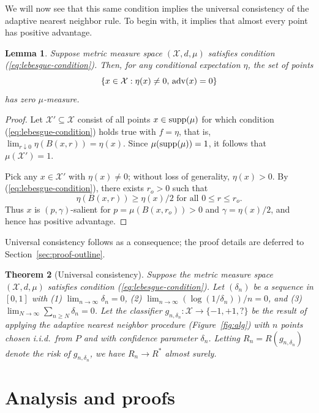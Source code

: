 \documentclass{article}
\def\X{{\mathcal X}}
\def\supp{{\rm supp}}
\def\adv{{\rm adv}}
\newtheorem{theorem}{Theorem}
\newtheorem{lemma}[theorem]{Lemma}
\newcommand{\new}[1]{\color{red} #1}
\begin{document}
We will now see that this same condition implies the universal consistency of the adaptive nearest neighbor rule. To begin with, it implies that almost every point has positive advantage.
\begin{lemma}
Suppose metric measure space $(\X, d, \mu)$ satisfies condition (\ref{eq:lebesgue-condition}). Then,
{\new{for any conditional expectation $\eta$}}, the set of points
$$ \{x \in \X: \eta(x) \neq 0, \, \adv(x) = 0\}$$
has zero $\mu$-measure.
\label{lemma:positive-advantage}
\end{lemma}
\begin{proof}
Let $\X' \subseteq \X$ consist of all points $x \in \supp(\mu)$ for which condition (\ref{eq:lebesgue-condition}) holds true with $f=\eta$, that is, $\lim_{r \downarrow 0} \eta(B(x,r)) = \eta(x)$. 
Since $\mu(\supp(\mu))=1$, it follows that $\mu(\X') = 1$. 

Pick any $x \in \X'$ with $\eta(x) \neq 0$; without loss of generality, $\eta(x) > 0$. By (\ref{eq:lebesgue-condition}), there exists $r_o > 0$ such that
$$\eta(B(x,r)) \geq \eta(x)/2 \mbox{\  for all \ } 0 \leq r \leq r_o.$$
Thus $x$ is $(p,\gamma)$-salient for $p = \mu(B(x,r_o)) > 0$ and $\gamma = \eta(x)/2$, and hence has positive advantage.
\end{proof}

Universal consistency follows as a consequence; the proof details are deferred to Section~\ref{sec:proof-outline}.
\begin{theorem}[Universal consistency]
Suppose the metric measure space $(\X, d, \mu)$ satisfies condition (\ref{eq:lebesgue-condition}). Let $(\delta_n)$ be a sequence in $[0,1]$ with (1) $\lim_{n \rightarrow \infty} \delta_n = 0$, (2) $\lim_{n \rightarrow \infty} (\log (1/\delta_n))/n = 0$, and (3) $\lim_{N \rightarrow \infty} \sum_{n \geq N} \delta_n = 0$. Let the classifier $g_{n, \delta_n}: \X \rightarrow \{-1,+1,?\}$ be the result of applying the adaptive nearest neighbor procedure (Figure~\ref{fig:alg}) with $n$ points chosen i.i.d.\ from $P$ and with confidence parameter $\delta_n$. Letting $R_n = R(g_{n,\delta_n})$ denote the risk of $g_{n,\delta_n}$, we have $R_n \rightarrow R^*$ almost surely.
\label{thm:universal-consistency}
\end{theorem}

\section{Analysis and proofs}\label{sec:gen3}
\label{sec:proof-outline}
\end{document}
